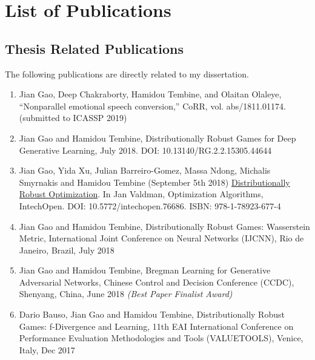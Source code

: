 \documentclass{article}
\begin{document}

\clearpage



\section{List of Publications}
\label{Sec:Pub}

\subsection{Thesis Related Publications}
The following publications are directly related to my dissertation.
\begin{enumerate}
\item Jian Gao, Deep Chakraborty, Hamidou Tembine, and Olaitan Olaleye, “Nonparallel emotional speech conversion,” CoRR, vol. abs/1811.01174. (submitted to ICASSP 2019)
\item Jian Gao and Hamidou Tembine, Distributionally Robust Games for Deep Generative Learning, July 2018. DOI: 10.13140/RG.2.2.15305.44644
\item Jian Gao, Yida Xu, Julian Barreiro-Gomez, Massa Ndong, Michalis Smyrnakis and Hamidou Tembine (September 5th 2018) \href{https://www.intechopen.com/books/optimization-algorithms-examples/distributionally-robust-optimization}{Distributionally Robust Optimization}. In Jan Valdman, Optimization Algorithms, IntechOpen. DOI: 10.5772/intechopen.76686. ISBN: 978-1-78923-677-4
\item Jian Gao and Hamidou Tembine, Distributionally Robust Games: Wasserstein Metric, International Joint Conference on Neural Networks (IJCNN), Rio de Janeiro, Brazil, July 2018
\item Jian Gao and Hamidou Tembine, Bregman Learning for Generative Adversarial Networks, Chinese Control and Decision Conference (CCDC), Shenyang, China, June 2018 \textit{(Best Paper Finalist Award)}
\item Dario Bauso, Jian Gao and Hamidou Tembine, Distributionally Robust Games: f-Divergence and Learning, 11th EAI International Conference on Performance Evaluation Methodologies and Tools (VALUETOOLS), Venice, Italy, Dec 2017
\end{enumerate}
\end{document}
